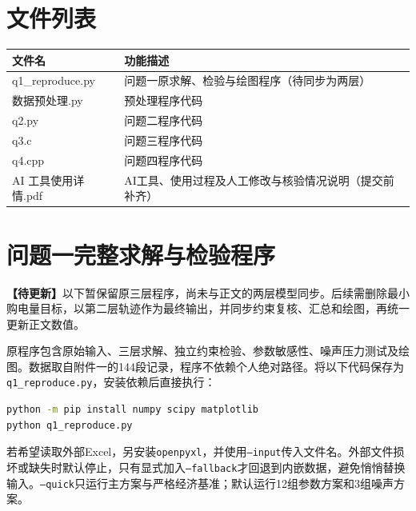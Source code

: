 \documentclass[withoutpreface,bwprint]{cumcmthesis}
\newcommand{\qonepending}[1]{\par\begingroup\small\raggedright\noindent\textbf{【待更新】}#1\par\endgroup}
\begin{document}
\newpage
\begin{appendices}
	
	
	
	
\section{文件列表}
\begin{table}[H]
\centering
\begin{tabularx}{\textwidth}{LL}
\toprule
文件名   & 功能描述 \\
\midrule
q1\_reproduce.py & 问题一原求解、检验与绘图程序（待同步为两层） \\
数据预处理.py & 预处理程序代码 \\
q2.py & 问题二程序代码 \\
q3.c & 问题三程序代码 \\
q4.cpp & 问题四程序代码 \\
AI 工具使用详情.pdf & AI工具、使用过程及人工修改与核验情况说明（提交前补齐） \\
\bottomrule
\end{tabularx}
\label{tab:文件列表}
\end{table}








%
%
%
%
%
%
%
%
%

\clearpage
\section{问题一完整求解与检验程序}\label{app:q1-code}
\qonepending{以下暂保留原三层程序，尚未与正文的两层模型同步。后续需删除最小购电量目标，以第二层轨迹作为最终输出，并同步约束复核、汇总和绘图，再统一更新正文数值。}
原程序包含原始输入、三层求解、独立约束检验、参数敏感性、噪声压力测试及绘图。数据取自附件一的144段记录，程序不依赖个人绝对路径。将以下代码保存为\texttt{q1\_reproduce.py}，安装依赖后直接执行：
\begin{lstlisting}[language=bash,basicstyle=\ttfamily\small,frame=single,numbers=none]
python -m pip install numpy scipy matplotlib
python q1_reproduce.py
\end{lstlisting}
若希望读取外部Excel，另安装\texttt{openpyxl}，并使用\texttt{--input}传入文件名。外部文件损坏或缺失时默认停止，只有显式加入\texttt{--fallback}才回退到内嵌数据，避免悄悄替换输入。\texttt{--quick}只运行主方案与严格经济基准；默认运行12组参数方案和3组噪声方案。


\end{appendices}
\end{document}
